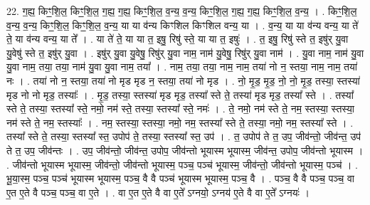 \documentclass[17pt]{extarticle}
\begin{document}
22. ग॒ह्य॒ किꣳ॒॒शि॒ल॒ किꣳ॒॒शि॒ल॒ ग॒ह्य॒ ग॒ह्य॒ किꣳ॒॒शि॒ल॒ व॒न्य॒ व॒न्य॒ किꣳ॒॒शि॒ल॒ ग॒ह्य॒ ग॒ह्य॒ किꣳ॒॒शि॒ल॒ व॒न्य॒ । . किꣳ॒॒शि॒ल॒ व॒न्य॒ व॒न्य॒ किꣳ॒॒शि॒ल॒ किꣳ॒॒शि॒ल॒ व॒न्य॒ या या व॑न्य किꣳशिल किꣳशिल वन्य॒ या । . व॒न्य॒ या या व॑न्य वन्य॒ या ते॑ ते॒ या व॑न्य वन्य॒ या ते᳚ । . या ते॑ ते॒ या या त॒ इषु॒ रिषु॑ स्ते॒ या या त॒ इषुः॑ । . त॒ इषु॒ रिषु॑ स्ते त॒ इषु॑र् यु॒वा यु॒वेषु॑ स्ते त॒ इषु॑र् यु॒वा । . इषु॑र् यु॒वा यु॒वेषु॒ रिषु॑र् यु॒वा नाम॒ नाम॑ यु॒वेषु॒ रिषु॑र् यु॒वा नाम॑ । . यु॒वा नाम॒ नाम॑ यु॒वा यु॒वा नाम॒ तया॒ तया॒ नाम॑ यु॒वा यु॒वा नाम॒ तया᳚ । . नाम॒ तया॒ तया॒ नाम॒ नाम॒ तया॑ नो न॒ स्तया॒ नाम॒ नाम॒ तया॑ नः । . तया॑ नो न॒ स्तया॒ तया॑ नो मृड मृड न॒ स्तया॒ तया॑ नो मृड । . नो॒ मृ॒ड॒ मृ॒ड॒ नो॒ नो॒ मृ॒ड॒ तस्या॒ स्तस्या॑ मृड नो नो मृड॒ तस्याः᳚ । . मृ॒ड॒ तस्या॒ स्तस्या॑ मृड मृड॒ तस्या᳚ स्ते ते॒ तस्या॑ मृड मृड॒ तस्या᳚ स्ते । . तस्या᳚ स्ते ते॒ तस्या॒ स्तस्या᳚ स्ते॒ नमो॒ नम॑ स्ते॒ तस्या॒ स्तस्या᳚ स्ते॒ नमः॑ । . ते॒ नमो॒ नम॑ स्ते ते॒ नम॒ स्तस्या॒ स्तस्या॒ नम॑ स्ते ते॒ नम॒ स्तस्याः᳚ । . नम॒ स्तस्या॒ स्तस्या॒ नमो॒ नम॒ स्तस्या᳚ स्ते ते॒ तस्या॒ नमो॒ नम॒ स्तस्या᳚ स्ते । . तस्या᳚ स्ते ते॒ तस्या॒ स्तस्या᳚ स्त॒ उपोप॑ ते॒ तस्या॒ स्तस्या᳚ स्त॒ उप॑ । . त॒ उपोप॑ ते त॒ उप॒ जीव॑न्तो॒ जीव॑न्त॒ उप॑ ते त॒ उप॒ जीव॑न्तः । . उप॒ जीव॑न्तो॒ जीव॑न्त॒ उपोप॒ जीव॑न्तो भूयास्म भूयास्म॒ जीव॑न्त॒ उपोप॒ जीव॑न्तो भूयास्म । . जीव॑न्तो भूयास्म भूयास्म॒ जीव॑न्तो॒ जीव॑न्तो भूयास्म॒ पञ्च॒ पञ्च॑ भूयास्म॒ जीव॑न्तो॒ जीव॑न्तो भूयास्म॒ पञ्च॑ । . भू॒या॒स्म॒ पञ्च॒ पञ्च॑ भूयास्म भूयास्म॒ पञ्च॒ वै वै पञ्च॑ भूयास्म भूयास्म॒ पञ्च॒ वै । . पञ्च॒ वै वै पञ्च॒ पञ्च॒ वा ए॒त ए॒ते वै पञ्च॒ पञ्च॒ वा ए॒ते । . वा ए॒त ए॒ते वै वा ए॒ते᳚ ऽग्नयो॒ ऽग्नय॑ ए॒ते वै वा ए॒ते᳚ ऽग्नयः॑ । \newline
\end{document}
